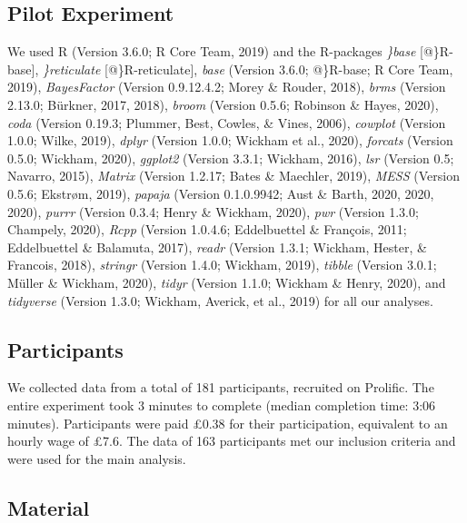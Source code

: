 \documentclass[
  english,
  man]{apa6}
\begin{document}
\hypertarget{pilot-experiment}{%
\subsection{Pilot Experiment}\label{pilot-experiment}}

We used R (Version 3.6.0; R Core Team, 2019) and the R-packages \emph{\}base} {[}@\}R-base{]}, \emph{\}reticulate} {[}@\}R-reticulate{]}, \emph{base} (Version 3.6.0; @\}R-base; R Core Team, 2019), \emph{BayesFactor} (Version 0.9.12.4.2; Morey \& Rouder, 2018), \emph{brms} (Version 2.13.0; Bürkner, 2017, 2018), \emph{broom} (Version 0.5.6; Robinson \& Hayes, 2020), \emph{coda} (Version 0.19.3; Plummer, Best, Cowles, \& Vines, 2006), \emph{cowplot} (Version 1.0.0; Wilke, 2019), \emph{dplyr} (Version 1.0.0; Wickham et al., 2020), \emph{forcats} (Version 0.5.0; Wickham, 2020), \emph{ggplot2} (Version 3.3.1; Wickham, 2016), \emph{lsr} (Version 0.5; Navarro, 2015), \emph{Matrix} (Version 1.2.17; Bates \& Maechler, 2019), \emph{MESS} (Version 0.5.6; Ekstrøm, 2019), \emph{papaja} (Version 0.1.0.9942; Aust \& Barth, 2020, 2020, 2020), \emph{purrr} (Version 0.3.4; Henry \& Wickham, 2020), \emph{pwr} (Version 1.3.0; Champely, 2020), \emph{Rcpp} (Version 1.0.4.6; Eddelbuettel \& François, 2011; Eddelbuettel \& Balamuta, 2017), \emph{readr} (Version 1.3.1; Wickham, Hester, \& Francois, 2018), \emph{stringr} (Version 1.4.0; Wickham, 2019), \emph{tibble} (Version 3.0.1; Müller \& Wickham, 2020), \emph{tidyr} (Version 1.1.0; Wickham \& Henry, 2020), and \emph{tidyverse} (Version 1.3.0; Wickham, Averick, et al., 2019) for all our analyses.

\hypertarget{participants-1}{%
\subsection{Participants}\label{participants-1}}

We collected data from a total of 181 participants, recruited on Prolific. The entire experiment took 3 minutes to complete (median completion time: 3:06 minutes). Participants were paid £0.38 for their participation, equivalent to an hourly wage of £7.6. The data of 163 participants met our inclusion criteria and were used for the main analysis.

\hypertarget{material}{%
\subsection{Material}\label{material}}
\end{document}
